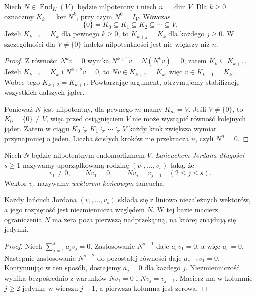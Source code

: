 \begin{stwierdzenie}
\label{prop:lin17-kernel-filtration}
Niech \(N\in\operatorname{End}_K(V)\)
będzie nilpotentny i niech \(n=\dim V\).
Dla \(k\ge0\) oznaczmy
\(K_k=\ker N^k\), przy czym \(N^0=I_V\).
Wówczas
\[
 \{0\}=K_0\subseteq K_1\subseteq
 K_2\subseteq\cdots\subseteq V.
\]
Jeżeli \(K_{k+1}=K_k\) dla pewnego \(k\ge0\),
to \(K_{k+j}=K_k\) dla każdego \(j\ge0\).
W szczególności dla \(V\ne\{0\}\)
indeks nilpotentności jest nie większy niż \(n\).
\end{stwierdzenie}
\begin{proof}
Z równości \(N^kv=0\) wynika
\(N^{k+1}v=N(N^kv)=0\), zatem
\(K_k\subseteq K_{k+1}\).
Jeżeli \(K_{k+1}=K_k\)
i \(N^{k+2}v=0\), to
\(Nv\in K_{k+1}=K_k\), więc
\(v\in K_{k+1}=K_k\).
Wobec tego \(K_{k+2}=K_{k+1}\).
Powtarzając argument, otrzymujemy
stabilizację wszystkich dalszych jąder.

Ponieważ \(N\) jest nilpotentny,
dla pewnego \(m\) mamy \(K_m=V\).
Jeśli \(V\ne\{0\}\), to
\(K_0=\{0\}\ne V\), więc
przed osiągnięciem \(V\)
nie może wystąpić równość kolejnych jąder.
Zatem w ciągu
\(K_0\subsetneq K_1\subsetneq\cdots\subsetneq V\)
każdy krok zwiększa wymiar przynajmniej o jeden.
Liczba ścisłych kroków nie przekracza \(n\),
czyli \(N^n=0\).
\end{proof}

\begin{definicja}
\label{def:lin17-jordan-chain}
Niech \(N\) będzie nilpotentnym
endomorfizmem \(V\).
\emph{Łańcuchem Jordana długości \(s\ge1\)}
nazywamy uporządkowaną rodzinę
\((v_1,\ldots,v_s)\) taką, że
\[
 v_1\ne0,\qquad Nv_1=0,\qquad
 Nv_j=v_{j-1}\quad(2\le j\le s).
\]
Wektor \(v_s\) nazywamy
\emph{wektorem końcowym} łańcucha.
\end{definicja}

\begin{stwierdzenie}
\label{prop:lin17-chain-independent}
Każdy łańcuch Jordana \((v_1,\ldots,v_s)\)
składa się z liniowo niezależnych wektorów,
a jego rozpiętość jest niezmiennicza względem \(N\).
W tej bazie macierz ograniczenia \(N\)
ma zera poza pierwszą nadprzekątną,
na której znajdują się jedynki.
\end{stwierdzenie}
\begin{proof}
Niech \(\sum_{j=1}^{s}a_jv_j=0\).
Zastosowanie \(N^{s-1}\) daje
\(a_sv_1=0\), a więc \(a_s=0\).
Następnie zastosowanie \(N^{s-2}\)
do pozostałej równości daje
\(a_{s-1}v_1=0\).
Kontynuując w ten sposób, dostajemy
\(a_j=0\) dla każdego \(j\).
Niezmienniczość wynika bezpośrednio
z warunków \(Nv_1=0\) i \(Nv_j=v_{j-1}\).
Macierz ma w kolumnie \(j\ge2\)
jedynkę w wierszu \(j-1\),
a pierwsza kolumna jest zerowa.
\end{proof}

